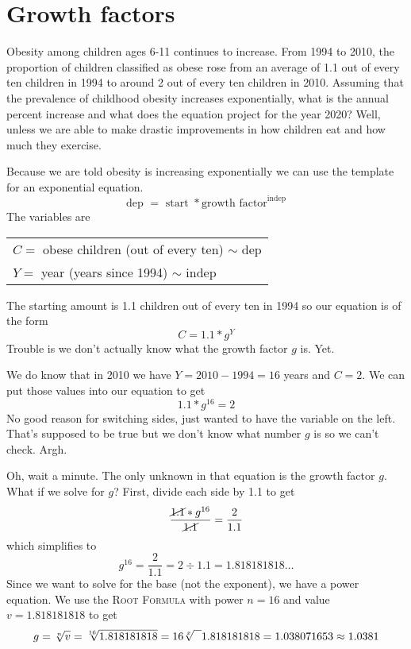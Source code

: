 

\section{Growth factors}

Obesity among children ages 6-11 continues to increase.  From 1994 to 2010, the proportion of children classified as obese rose from an average of 1.1 out of every ten children in 1994 to around 2 out of every ten children in 2010.
Assuming that the prevalence of childhood obesity increases exponentially, what is the annual percent increase and what does the equation project for the year 2020? Well, unless we are able to make drastic improvements in how children eat and how much they exercise.

Because we are told obesity is increasing exponentially we can use the template for an exponential equation.  
$$\text{dep }=\text{ start } \ast \text{growth factor}^{\text{indep}}$$
The variables are 
\begin{center}
\begin{tabular} {l} 
$C=$ obese children (out of every ten) $\sim$ dep \\ 
$Y =$ year (years since 1994) $\sim$ indep \\
\end{tabular}
\end{center}
The starting amount  is 1.1 children out of every ten in 1994 so our equation is of the form $$C = 1.1 \ast g^Y$$
Trouble is we don't actually know what the growth factor $g$ is.  Yet.  

We do know that in 2010 we have $Y = 2010 - 1994 = 16$ years and $C = 2$.  We can put those values into our equation to get $$1.1 \ast g^{16}=2$$
No good reason for switching sides, just wanted to have the variable on the left.
That's supposed to be true but we don't know what number $g$ is so we can't check.  Argh.  

Oh, wait a minute.  The only unknown in that equation is the growth factor $g$.  What if we solve for $g$?  First, divide each side by  1.1 to get
$$ \frac{\cancel{1.1}\ast g^{16}}{\cancel{1.1}} = \frac{2}{1.1} $$
which simplifies to $$g^{16} = \frac{2}{1.1} = 2 \div 1.1= 1.818181818\ldots$$
Since we want to solve for the base (not the exponent), we have a power equation.  We use the \textsc{Root Formula} with power $n=16$ and value $v=1.818181818$ to get
$$g = \sqrt[n]{v} = \sqrt[16]{1.818181818} = 16 \sqrt[x]{\text{\raisebox{.6em}{~\text{  }}}} 1.818181818 = 1.038071653 \approx 1.0381$$  

